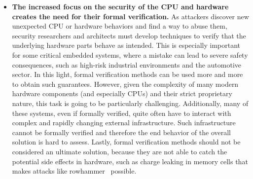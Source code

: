 \begin{itemize}
	
		\item \textbf{The increased focus on the security of the CPU and hardware creates the need for their formal verification.} As attackers discover new unexpected CPU or hardware behaviors and find a way to abuse them, security researchers and architects must develop techniques to verify that the underlying hardware parts behave as intended. This is especially important for some critical embedded systems, where a mistake can lead to severe safety consequences, such as high-risk industrial environments and the automotive sector. In this light, formal verification methods can be used more and more to obtain such guarantees. However, given the complexity of many modern hardware components (and especially CPUs) and their strict proprietary nature, this task is going to be particularly challenging. Additionally, many of these systems, even if formally verified, quite often have to interact with complex and rapidly changing external infrastructure. Such infrastructure cannot be formally verified and therefore the end behavior of the overall solution is hard to assess. Lastly, formal verification methods should not be considered an ultimate solution, because they are not able to catch the potential side effects in hardware, such as charge leaking in memory cells that makes attacks like rowhammer~\cite{seaborn2015exploiting} possible.	
		\end{itemize}
		
		
